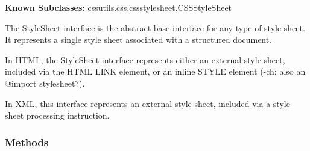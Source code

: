 \textbf{Known Subclasses:} cssutils.css.cssstylesheet.CSSStyleSheet


The StyleSheet interface is the abstract base interface
for any type of style sheet. It represents a single style
sheet associated with a structured document.

In HTML, the StyleSheet interface represents either an
external style sheet, included via the HTML LINK element,
or an inline STYLE element (-ch: also an @import stylesheet?).

In XML, this interface represents
an external style sheet, included via a style sheet
processing instruction.


  \subsubsection{Methods}

    \vspace{0.5ex}

